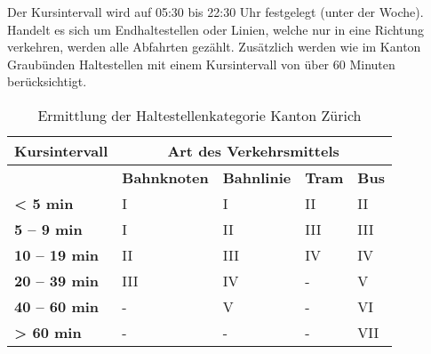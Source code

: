 Der Kursintervall wird auf 05:30 bis 22:30 Uhr festgelegt (unter der Woche).
Handelt es sich um Endhaltestellen oder Linien, welche nur in eine Richtung verkehren, werden alle Abfahrten gezählt.
Zusätzlich werden wie im Kanton Graubünden  Haltestellen mit einem Kursintervall von über 60 Minuten berücksichtigt.

\begin{table}[ht]
    \begin{tabular}[c]{l p{2.9cm} p{2.8cm} p{2.8cm} p{2.8cm}}
        \toprule
        \textbf{Kursintervall}
                                & \multicolumn{4}{c}{\textbf{Art des Verkehrsmittels}}\\
        \midrule
        \textbf{}
                                & \textbf{Bahnknoten}
                                & \textbf{Bahnlinie}
                                & \textbf{Tram}
                                & \textbf{Bus}\\
        \textbf{< 5 min}
                                & I
                                & I
                                & II
                                & II\\
        \textbf{5 -- 9 min}
                                & I
                                & II
                                & III
                                & III\\
        \textbf{10 -- 19 min}
                                & II
                                & III
                                & IV
                                & IV\\
        \textbf{20 -- 39 min}
                                & III
                                & IV
                                & -
                                & V\\
        \textbf{40 -- 60 min}
                                & -
                                & V
                                & -
                                & VI\\
        \cellcolor{red!25}\textbf{> 60 min}
                                & -
                                & -
                                & -
                                & \cellcolor{red!25}VII\\
        \bottomrule
    \end{tabular}
    \caption{Ermittlung der Haltestellenkategorie Kanton Zürich}
    \label{table:Ermittlung der Haltestellenkategorie Kanton Zürich}
\end{table}


